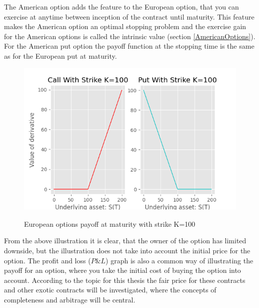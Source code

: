 The American option adds the feature to the European option, that you can exercise at anytime between inception of the contract until maturity. This feature makes the American option an optimal stopping problem and the exercise gain for the American options is called the intrinsic value (section \ref{AmericanOptions}). For the American put option the payoff function at the stopping time is the same as for the European put at maturity. 

\begin{figure}[H]
\centering
\includegraphics{Figures/contractfct.png}\\
\decoRule
\caption[Contract Functions]{European options payoff at maturity with strike K=100}
\label{fig:contractfct}
\end{figure}

From the above illustration it is clear, that the owner of the option has limited downside, but the illustration does not take into account the initial price for the option. The profit and loss ($P\& L$) graph is also a common way of illustrating the payoff for an option, where you take the initial cost of buying the option into account. According to the topic for this thesis the fair price for these contracts and other exotic contracts will be investigated, where the concepts of completeness and arbitrage will be central.


